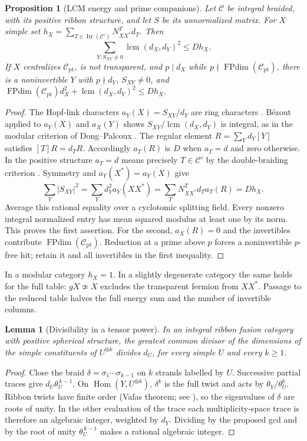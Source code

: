 \documentclass[11pt,a4paper]{article}
\numberwithin{equation}{section}
\newtheorem{proposition}[theorem]{Proposition}
\newtheorem{lemma}[theorem]{Lemma}
\theoremstyle{remark}
\newcommand{\C}{\mathcal C}
\newcommand{\FPdim}{\operatorname{FPdim}}
\newcommand{\Irr}{\operatorname{Irr}}
\newcommand{\Hom}{\operatorname{Hom}}
\newcommand{\pt}{\mathrm{pt}}
\newcommand{\lcm}{\operatorname{lcm}}
\begin{document}
\begin{proposition}[LCM energy and prime companions]\label{fam:M:2.2}\label{prop:braided-lcm}
Let $\C$ be integral braided, with its positive ribbon structure, and let $S$
be its unnormalized matrix. For $X$ simple set
$h_X=\sum_{T\in\Irr(\C')}N_{XX^*}^{T}d_T$. Then
\[
 \sum_{Y:S_{XY}\ne0}\lcm(d_X,d_Y)^2\le D h_X.
\]
If $X$ centralizes $\C_{\pt}$, is not transparent, and $p\mid d_X$ while
$p\nmid\FPdim(\C_{\pt})$, there is a noninvertible $Y$ with
$p\nmid d_Y$, $S_{XY}\ne0$, and
$\FPdim(\C_{\pt})d_X^2+\lcm(d_X,d_Y)^2\le Dh_X$.
\end{proposition}
\begin{proof}
The Hopf-link characters $a_Y(X)=S_{XY}/d_Y$ are ring characters
\cite[Proposition~8.13.11]{EGNO}. B\'ezout applied to $a_Y(X)$ and $a_X(Y)$ shows
$S_{XY}/\lcm(d_X,d_Y)$ is integral, as in the modular criterion of
Dong--Palcoux \cite[Lemma~2.7 and the proof of Theorem~1.1]{DPLCM}. The regular element
$R=\sum_Y d_Y[Y]$ satisfies $[T]R=d_T R$. Accordingly $a_T(R)$ is $D$
when $a_T=d$ and zero otherwise. In the positive structure $a_T=d$
means precisely $T\in\C'$ by the double-braiding criterion
\cite[Proposition~8.20.5(i)]{EGNO}. Symmetry and $a_Y(X^*)=\overline{a_Y(X)}$ give
\[
 \sum_Y |S_{XY}|^2
  =\sum_Y d_Y^2a_Y(XX^*)=\sum_T N_{XX^*}^{T}d_Ta_T(R)=Dh_X.
\]
Average this rational equality over a cyclotomic splitting field. Every
nonzero integral normalized entry has mean squared modulus at least one
by its norm. This proves the first assertion. For the second,
$a_X(R)=0$ and the invertibles contribute $\FPdim(\C_{\pt})$.
Reduction at a prime above $p$ forces a noninvertible $p$-free hit;
retain it and all invertibles in the first inequality.
\end{proof}
In a modular category $h_X=1$. In a slightly degenerate category the same
holds for the full table: $gX\not\simeq X$ excludes the transparent fermion
from $XX^*$. Passage to the reduced table halves the full energy sum
and the number of invertible columns.

\begin{lemma}[Divisibility in a tensor power]\label{fam:M:4.15}\label{lem:crossing-gcd}
In an integral ribbon fusion category with positive spherical structure, the greatest common divisor of the dimensions of the simple constituents of $U^{\otimes k}$ divides $d_U$, for every simple $U$ and every $k\ge1$.
\end{lemma}
\begin{proof}
Close the braid $\delta=\sigma_1\cdots\sigma_{k-1}$ on $k$ strands labelled by $U$. Successive partial traces give $d_U\theta_U^{\,k-1}$. On $\Hom(Y,U^{\otimes k})$, $\delta^k$ is the full twist and acts by $\theta_Y/\theta_U^k$. Ribbon twists have finite order (Vafa\textquotesingle s theorem; see \cite[Corollary~8.18.2(i)]{EGNO}), so the eigenvalues of $\delta$ are roots of unity. In the other evaluation of the trace each multiplicity-space trace is therefore an algebraic integer, weighted by $d_Y$. Dividing by the proposed gcd and by the root of unity $\theta_U^{\,k-1}$ makes a rational algebraic integer.
\end{proof}
\end{document}
